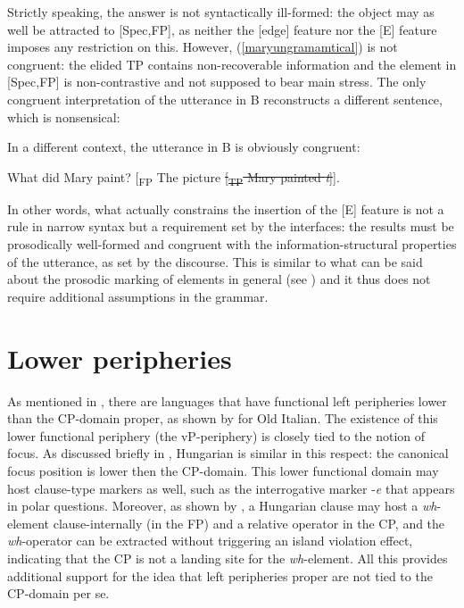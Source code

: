 Strictly speaking, the answer is not syntactically ill-formed: the object may as well be attracted to [Spec,FP], as neither the [edge] feature nor the [E] feature imposes any restriction on this. However, (\ref{maryungramamtical}) is not congruent: the elided TP contains non-recoverable information and the element in [Spec,FP] is non-contrastive and not supposed to bear main stress. The only congruent interpretation of the utterance in B reconstructs a different sentence, which is nonsensical:

\z

In a different context, the utterance in B is obviously congruent:

\begin{exe}
\ex 
\begin{xlist} 
 What did Mary paint?
 {[}\textsubscript{FP} The picture \sout{[\textsubscript{TP} Mary painted \textit{t}]}].
\end{xlist}
\end{exe}

In other words, what actually constrains the insertion of the [E] feature is not a rule in narrow syntax but a requirement set by the interfaces: the results must be prosodically well-formed and congruent with the information-structural properties of the utterance, as set by the discourse. This is similar to what can be said about the prosodic marking of elements in general (see ) and it thus does not require additional assumptions in the grammar.

\section{Lower peripheries} \label{sec:6lower}\largerpage
As mentioned in , there are languages that have functional left peripheries lower than the CP-domain proper, as shown by \citet{poletto2006} for Old Italian. The existence of this lower functional periphery (the vP-periphery) is closely tied to the notion of focus. As discussed briefly in , Hungarian is similar in this respect: the canonical focus position is lower then the CP-domain. This lower functional domain may host clause-type markers as well, such as the interrogative marker -\textit{e} that appears in polar questions. Moreover, as shown by \citet{liptakzimmermann2007}, a Hungarian clause may host a \textit{wh}-element clause-internally (in the FP) and a relative operator in the CP, and the \textit{wh}-operator can be extracted without triggering an island violation effect, indicating that the CP is not a landing site for the \textit{wh}-element. All this provides additional support for the idea that left peripheries proper are not tied to the CP-domain per se.

